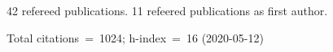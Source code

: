 42 refereed publications. 11 refeered publications as first author.

Total citations~=~1024; h-index~=~16 (2020-05-12)